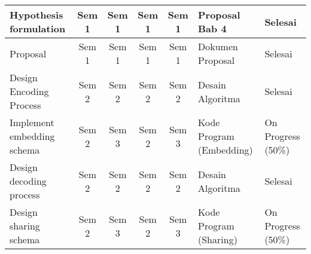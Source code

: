 \documentclass{ittelkom}
\newcommand{\blue}{\cellcolor{blue!75}}
\begin{document}
\begin{table}[h]
\begin{tabular}{|l|c|c|c|c|l|l|}
        Hypothesis formulation                                                  & Sem 1                                                 & Sem 1                                                    & Sem 1                                                                       & Sem 1                                                                     & Proposal Bab 4                                & Selesai                                       \\ \hline
        \rowcolor[HTML]{EFEFEF}
        Proposal                                                                & Sem 1                                                 & Sem 1                                                    & Sem 1                                                                       & Sem 1                                                                     & Dokumen Proposal                              & Selesai                                       \\ \hline
        Design Encoding Process                                                 & Sem 2                                                 & Sem 2                                                    & Sem 2                                                                       & Sem 2                                                                     & Desain Algoritma                              & Selesai                                       \\ \hline
        \rowcolor[HTML]{EFEFEF}
        Implement embedding schema                                              & Sem 2                                                 & Sem 3                                                    & Sem 2                                                                       & \blue Sem 3                                                               & Kode Program (Embedding)                      & \blue On Progress (50\%)                      \\ \hline
        Design decoding process                                                 & Sem 2                                                 & Sem 2                                                    & Sem 2                                                                       & Sem 2                                                                     & Desain Algoritma                              & Selesai                                       \\ \hline
        \rowcolor[HTML]{EFEFEF}
        Design sharing schema                                                   & Sem 2                                                 & Sem 3                                                    & Sem 2                                                                       & \blue Sem 3                                                               & Kode Program (Sharing)                        & \blue On Progress (50\%)                      \\ \hline

\end{tabular}
\end{table}
\end{document}
